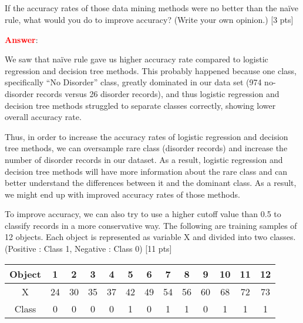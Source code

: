 \documentclass{homework}
\begin{document}
    \subsection{}
    If the accuracy rates of those data mining methods were no better than the naïve rule, what would you do to improve accuracy? (Write your own opinion.) [3 pts]
    
    \textbf{\textcolor{red}{Answer}}:
    
    We saw that naïve rule gave us higher accuracy rate compared to
    logistic regression and decision tree methods. This probably happened because one class, specifically “No Disorder” class, greatly dominated in our data set (974 no-disorder records versus 26 disorder records), and thus logistic regression and decision tree methods struggled to separate classes correctly, showing lower overall accuracy rate.
    
    Thus, in order to increase the accuracy rates of logistic regression and decision tree methods, we
    can oversample rare class (disorder records) and increase the number of disorder records in our dataset. As a result, logistic regression and decision tree methods will have more information
    about the rare class and can better understand the differences between it and the dominant class. As a result, we might end up with improved accuracy rates of those methods.
    
    To improve accuracy, we can also try to use a higher cutoff value than 0.5 to classify records in a more conservative way.
    \vspace{10mm}
    \newpage
    \exercise*
    The following are training samples of 12 objects. Each object is represented as variable X and divided into two classes. (Positive : Class 1, Negative : Class 0) [11 pts]
    
    \begin{table}[!h]
    \begin{center}
    \begin{tabular}{|c|cccccccccccc|}
    \hline
    Object & 1  & 2  & 3  & 4  & 5  & 6  & 7  & 8  & 9  & 10 & 11 & 12 \\ \hline
    X      & 24 & 30 & 35 & 37 & 42 & 49 & 54 & 56 & 60 & 68 & 72 & 73 \\
    Class  & 0  & 0  & 0  & 0 &  1  & 0  & 1  & 1  & 0  & 1  & 1  & 1  \\ \hline
    \end{tabular}
    \end{center}
    \end{table}
  
\end{document}
